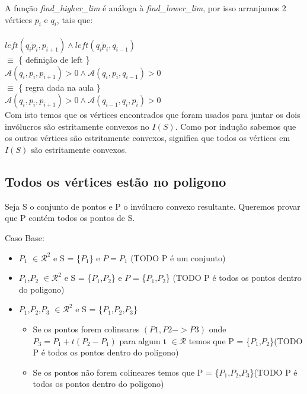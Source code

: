 \documentclass[11pt]{article}
\begin{document}
A função \textit{find\_higher\_lim} é análoga à \textit{find\_lower\_lim},
por isso arranjamos 2 vértices $p_i$ e $q_i$, tais que:\\
\\
$left(\overline{q_i p_i}, p_{i+1}) \wedge left(\overline{q_i p_i}, q_{i-1})$\\
$\equiv$ \{ definição de left \}\\
$\mathcal{A}(q_i, p_i, p_{i+1}) > 0 \wedge \mathcal{A}(q_i, p_i, q_{i-1}) > 0$\\
$\equiv$ \{ regra dada na aula \}\\
$\mathcal{A}(q_i, p_i, p_{i+1}) > 0 \wedge \mathcal{A}(q_{i-1}, q_i, p_i) > 0$\\

Com isto temos que os vértices encontrados que foram 
usados para juntar os dois invólucros são estritamente
convexos no $I(S)$. Como por indução sabemos que os 
outros vértices são estritamente convexos, significa
que todos os vértices em $I(S)$ são estritamente convexos.




\subsection{Todos os vértices estão no poligono}

Seja S o conjunto de pontos e P o invólucro convexo resultante.
Queremos provar que P contém todos os pontos de S.

Caso Base:
\begin{itemize}
    \item $P_1$ $\in \mathcal{R}^2$ e S = \{$P_1$\} e $P = P_1$ (TODO P é um conjunto)
    \item $P_1$,$P_2$ $\in \mathcal{R}^2$ e S = \{$P_1$,$P_2$\} e $P$ = \{$P_1$,$P_2$\} (TODO P é todos os pontos dentro do poligono)
    \item $P_1$,$P_2$,$P_3$ $\in \mathcal{R}^2$ e S = \{$P_1$,$P_2$,$P_3$\} 
        \newline
        \begin{itemize}
            \item Se os pontos forem colineares $(P1,P2 -> P3)$ 
                \newline
                onde $P_3 = P_1 + t(P_2 - P_1)$ para algum t $\in \mathcal{R}$
                \newline
                 temos que P = \{$P_1$,$P_2$\}(TODO P é todos os pontos dentro do poligono)

            \item Se os pontos não forem colineares  
                \newline
                 temos que P = \{$P_1$,$P_2$,$P_3$\}(TODO P é todos os pontos dentro do poligono)
        \end{itemize}
\end{itemize}
\end{document}
